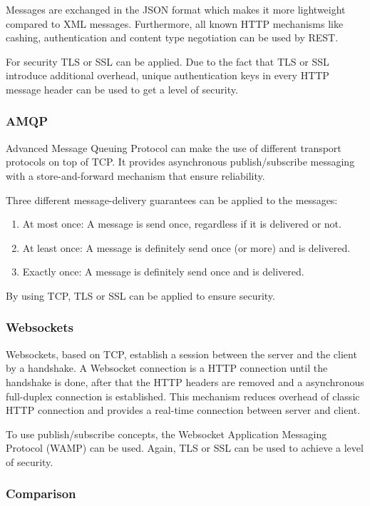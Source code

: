 Messages are exchanged in the JSON format which makes it more lightweight compared to XML messages. Furthermore, all known HTTP mechanisms like cashing, authentication and content type negotiation can be used by REST.

For security TLS or SSL can be applied. Due to the fact that TLS or SSL introduce additional overhead, unique authentication keys in every HTTP message header can be used to get a level of security.

\subsubsection{AMQP}
Advanced Message Queuing Protocol can make the use of different transport protocols on top of TCP. It provides asynchronous publish/subscribe messaging with a store-and-forward mechanism that ensure reliability. 

Three different message-delivery guarantees can be applied to the messages:

\begin{enumerate}
	\item At most once: A message is send once, regardless if it is delivered or not.
	\item At least once: A message is definitely send once (or more) and is delivered.
	\item Exactly once: A message is definitely send once and is delivered.
\end{enumerate}

By using TCP, TLS or SSL can be applied to ensure security.

\subsubsection{Websockets}
Websockets, based on TCP, establish a session between the server and the client by a handshake. A Websocket connection is a HTTP connection until the handshake is done, after that the HTTP headers are removed and a asynchronous full-duplex connection is established. This mechanism reduces overhead of classic HTTP connection and provides a real-time connection between server and client.

To use publish/subscribe concepts, the Websocket Application Messaging Protocol (WAMP) can be used. Again, TLS or SSL can be used to achieve a level of security.

\subsubsection{Comparison}

